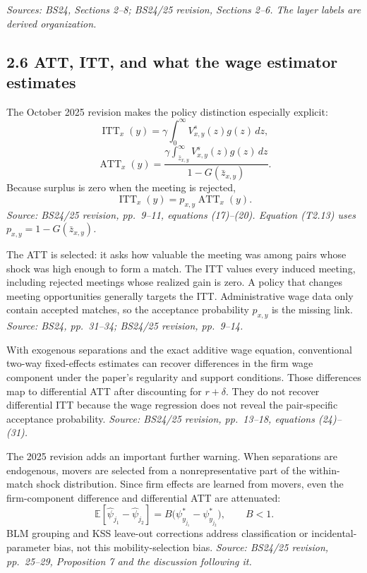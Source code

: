 \documentclass[11pt]{article}
\begin{document}
\textit{Sources: BS24, Sections 2--8; BS24/25 revision, Sections 2--6.  The
layer labels are derived organization.}

\subsection{2.6 ATT, ITT, and what the wage estimator estimates}

The October 2025 revision makes the policy distinction especially explicit:
\[
\operatorname{ITT}_x(y)
=
\gamma\int_0^\infty V^s_{x,y}(z)g(z)\,dz,
\tag{T2.11}
\]
\[
\operatorname{ATT}_x(y)
=
\frac{
\gamma\int_{\bar z_{x,y}}^\infty
V^s_{x,y}(z)g(z)\,dz
}{
1-G(\bar z_{x,y})
}.
\tag{T2.12}
\]
Because surplus is zero when the meeting is rejected,
\[
\operatorname{ITT}_x(y)
=
p_{x,y}\operatorname{ATT}_x(y).
\tag{T2.13}
\]
\textit{Source: BS24/25 revision, pp.\ 9--11, equations (17)--(20).
Equation (T2.13) uses \(p_{x,y}=1-G(\bar z_{x,y})\).}

The ATT is selected: it asks how valuable the meeting was among pairs whose
shock was high enough to form a match.  The ITT values every induced meeting,
including rejected meetings whose realized gain is zero.  A policy that changes
meeting opportunities generally targets the ITT.  Administrative wage data
only contain accepted matches, so the acceptance probability \(p_{x,y}\) is
the missing link.
\textit{Source: BS24, pp.\ 31--34; BS24/25 revision, pp.\ 9--14.}

With exogenous separations and the exact additive wage equation, conventional
two-way fixed-effects estimates can recover differences in the firm wage
component under the paper's regularity and support conditions.  Those
differences map to differential ATT after discounting for \(r+\delta\).  They
do not recover differential ITT because the wage regression does not reveal
the pair-specific acceptance probability.
\textit{Source: BS24/25 revision, pp.\ 13--18, equations (24)--(31).}

The 2025 revision adds an important further warning.  When separations are
endogenous, movers are selected from a nonrepresentative part of the
within-match shock distribution.  Since firm effects are learned from movers,
even the firm-component difference and differential ATT are attenuated:
\[
\mathbb E[\widehat\psi_{j_1}-\widehat\psi_{j_2}]
=
B\bigl(\psi^*_{y_{j_1}}-\psi^*_{y_{j_2}}\bigr),
\qquad B<1.
\tag{T2.14}
\]
BLM grouping and KSS leave-out corrections address classification or
incidental-parameter bias, not this mobility-selection bias.
\textit{Source: BS24/25 revision, pp.\ 25--29, Proposition 7 and the
discussion following it.}
\end{document}
